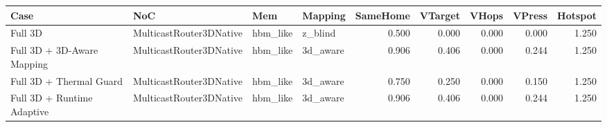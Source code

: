 \begin{tabular}{l l l l r r r r r}
\hline
Case & NoC & Mem & Mapping & SameHome & VTarget & VHops & VPress & Hotspot \\
\hline
Full 3D & MulticastRouter3DNative & hbm\_like & z\_blind & 0.500 & 0.000 & 0.000 & 0.000 & 1.250 \\
Full 3D + 3D-Aware Mapping & MulticastRouter3DNative & hbm\_like & 3d\_aware & 0.906 & 0.406 & 0.000 & 0.244 & 1.250 \\
Full 3D + Thermal Guard & MulticastRouter3DNative & hbm\_like & 3d\_aware & 0.750 & 0.250 & 0.000 & 0.150 & 1.250 \\
Full 3D + Runtime Adaptive & MulticastRouter3DNative & hbm\_like & 3d\_aware & 0.906 & 0.406 & 0.000 & 0.244 & 1.250 \\
\hline
\end{tabular}
